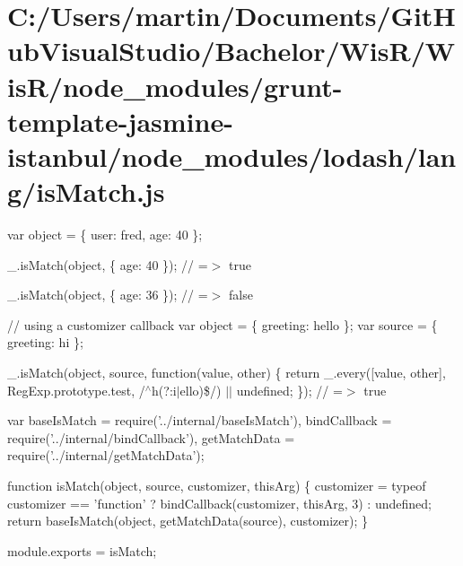 \hypertarget{_c_1_2_users_2martin_2_documents_2_git_hub_visual_studio_2_bachelor_2_wis_r_2_wis_r_2node_module0730f8db17ce5e6deda20881f6a9d0fc}{}\section{C\+:/\+Users/martin/\+Documents/\+Git\+Hub\+Visual\+Studio/\+Bachelor/\+Wis\+R/\+Wis\+R/node\+\_\+modules/grunt-\/template-\/jasmine-\/istanbul/node\+\_\+modules/lodash/lang/is\+Match.\+js}
var object = \{ \textquotesingle{}user\textquotesingle{}\+: \textquotesingle{}fred\textquotesingle{}, \textquotesingle{}age\textquotesingle{}\+: 40 \};

\+\_\+.\+is\+Match(object, \{ \textquotesingle{}age\textquotesingle{}\+: 40 \}); // =$>$ true

\+\_\+.\+is\+Match(object, \{ \textquotesingle{}age\textquotesingle{}\+: 36 \}); // =$>$ false

// using a customizer callback var object = \{ \textquotesingle{}greeting\textquotesingle{}\+: \textquotesingle{}hello\textquotesingle{} \}; var source = \{ \textquotesingle{}greeting\textquotesingle{}\+: \textquotesingle{}hi\textquotesingle{} \};

\+\_\+.\+is\+Match(object, source, function(value, other) \{ return \+\_\+.\+every(\mbox{[}value, other\mbox{]}, Reg\+Exp.\+prototype.\+test, /$^\wedge$h(?\+:i$\vert$ello)\$/) $\vert$$\vert$ undefined; \}); // =$>$ true


\begin{DoxyCodeInclude}
var baseIsMatch = require(\textcolor{stringliteral}{'../internal/baseIsMatch'}),
    bindCallback = require(\textcolor{stringliteral}{'../internal/bindCallback'}),
    getMatchData = require(\textcolor{stringliteral}{'../internal/getMatchData'});

\textcolor{keyword}{function} isMatch(\textcolor{keywordtype}{object}, source, customizer, thisArg) \{
  customizer = typeof customizer == \textcolor{stringliteral}{'function'} ? bindCallback(customizer, thisArg, 3) : undefined;
  \textcolor{keywordflow}{return} baseIsMatch(\textcolor{keywordtype}{object}, getMatchData(source), customizer);
\}

module.exports = isMatch;
\end{DoxyCodeInclude}
 